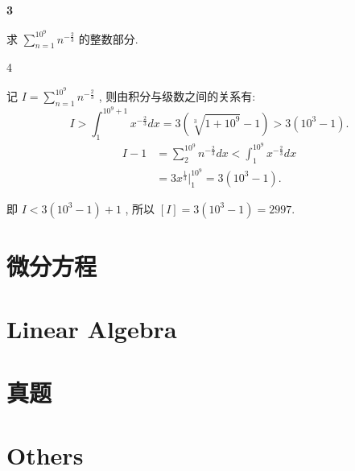 \documentclass[12pt]{article}
\newenvironment{solution}[2][Solution]{\begin{trivlist}
\item[\hskip \labelsep {\bfseries #1}]}{\end{trivlist}}
\newenvironment{problem}[2][Problem]{\begin{trivlist}
\item[\hskip \labelsep {\bfseries #1}\hskip \labelsep {\bfseries #2.}]}{\end{trivlist}}
\begin{document}
\begin{solution}{3} \textbf{3}
    
\end{solution}


\vspace{3cm}



\begin{problem}{4}
    求 $ \displaystyle \sum_{n=1}^{10^9} n^{-\frac{2}{3}} $ 的整数部分.
\end{problem}

\begin{solution} \textbf{4}

    记 $I = \sum_{n=1}^{10^9} n^{- \frac{2}{3}}$ , 则由积分与级数之间的关系有:
    \[
        I > \int_{1}^{10^9 + 1} x^{-\frac{2}{3}}dx = 3(\sqrt[3]{1 + 10^9} - 1) > 3(10^3 -1).    
    \]
    \[
        \begin{aligned}
        I - 1 &= \sum_{2}^{10^9} n^{-\frac{2}{3}}dx < \int_{1}^{10^9} x^{-\frac{2}{3}}dx   \\
        &= 3x^{\frac{1}{3}} \Big |_{1}^{10^9} = 3(10^3 -1).
        \end{aligned}
    \]

    即 $I < 3(10^3 -1) + 1$ , 所以 $[I] = 3(10^3 - 1) = 2997$.
\end{solution}

\vspace{3cm}



\pagebreak




\section{微分方程}


\section{Linear Algebra}



\section{真题}





\section{Others}
\end{document}
